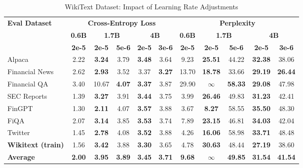 
\begin{table}[htbp]
\centering
\caption[WikiText: Learning Rate Comparison]{WikiText Dataset: Impact of Learning Rate Adjustments}
\label{tab:wikitext_lr_comparison}
\begin{tabular}{l|c|cc|cc|c|cc|cc}
\hline
\multirow{3}{*}{\textbf{Eval Dataset}} &
\multicolumn{5}{c|}{\textbf{Cross-Entropy Loss}} &
\multicolumn{5}{c}{\textbf{Perplexity}} \\
\cline{2-6} \cline{7-11}
& \textbf{0.6B} & \multicolumn{2}{c|}{\textbf{1.7B}} & \multicolumn{2}{c|}{\textbf{4B}} &
 \textbf{0.6B} & \multicolumn{2}{c|}{\textbf{1.7B}} & \multicolumn{2}{c}{\textbf{4B}} \\
\cline{3-4} \cline{5-6} \cline{8-9} \cline{10-11}
& \textbf{2e-5} & \textbf{2e-5} & \textbf{5e-6} & \textbf{2e-5} & \textbf{3e-6} &
 \textbf{2e-5} & \textbf{2e-5} & \textbf{5e-6} & \textbf{2e-5} & \textbf{3e-6} \\
\hline
 Alpaca & 2.22 & \textbf{3.24} & 3.79 & \textbf{3.48} & 3.64 & 9.23 & \textbf{25.51} & 44.22 & \textbf{32.38} & 38.06 \\
Financial News & 2.62 & \textbf{2.93} & 3.52 & 3.37 & \textbf{3.27} & 13.70 & \textbf{18.78} & 33.66 & \textbf{29.19} & \textbf{26.44} \\
 Financial QA & 3.40 & 10.67 & \textbf{4.07} & \textbf{3.37} & 3.87 & 29.90 & $\infty$ & \textbf{58.33} & \textbf{29.08} & 47.98 \\
 SEC Reports & 1.39 & \textbf{3.27} & 3.91 & \textbf{3.44} & 3.75 & 3.99 & \textbf{26.46} & 49.83 & \textbf{31.23} & 42.41 \\
 FinGPT & 1.30 & \textbf{2.11} & 4.07 & \textbf{3.57} & 3.88 & 3.67 & \textbf{8.27} & 58.55 & \textbf{35.50} & 48.30 \\
 FiQA & 2.07 & \textbf{3.14} & 3.85 & \textbf{3.53} & 3.74 & 7.89 & \textbf{23.15} & 46.81 & \textbf{34.03} & 42.04 \\
Twitter & 1.45 & \textbf{2.78} & 4.08 & \textbf{3.52} & 3.88 & 4.26 & \textbf{16.06} & 58.98 & \textbf{33.71} & 48.48 \\
\rowcolor{gray!20} \textbf{Wikitext (train)} & 1.56 & \textbf{3.42} & 3.88 & \textbf{3.30} & 3.65 & 4.78 & \textbf{30.63} & 48.44 & \textbf{27.19} & 38.60 \\
\rowcolor{blue!10} \textbf{Average} & \textbf{2.00} & \textbf{3.95} & \textbf{3.89} & \textbf{3.45} & \textbf{3.71} & \textbf{9.68} & \textbf{$\infty$} & \textbf{49.85} & \textbf{31.54} & \textbf{41.54}  \\
\hline
\end{tabular}
\end{table}
